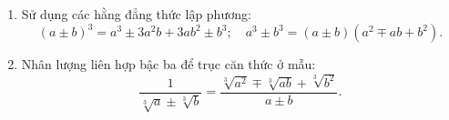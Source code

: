 \begin{enumerate}
\item Sử dụng các hằng đẳng thức lập phương:
$$(a \pm b)^3 = a^3 \pm 3a^2b + 3ab^2 \pm b^3;\quad a^3 \pm b^3 = (a \pm b)(a^2 \mp ab + b^2).$$
\item Nhân lượng liên hợp bậc ba để trục căn thức ở mẫu:
$$\dfrac{1}{\sqrt[3]{a} \pm \sqrt[3]{b}} = \dfrac{\sqrt[3]{a^2} \mp \sqrt[3]{ab} + \sqrt[3]{b^2}}{a \pm b}.$$
\end{enumerate}

